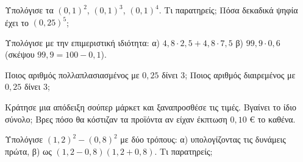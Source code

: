 \ex Υπολόγισε τα $(0{,}1)^2$, $(0{,}1)^3$, $(0{,}1)^4$. Τι παρατηρείς; Πόσα δεκαδικά ψηφία έχει το $(0{,}25)^5$;

\ex Υπολόγισε με την επιμεριστική ιδιότητα: α) $4{,}8\cdot2{,}5+4{,}8\cdot7{,}5$ \quad β) $99{,}9\cdot0{,}6$ (σκέψου $99{,}9=100-0{,}1$).

\ex Ποιος αριθμός πολλαπλασιασμένος με $0{,}25$ δίνει $3$; Ποιος αριθμός διαιρεμένος με $0{,}25$ δίνει $3$;


\ex Κράτησε μια απόδειξη σούπερ μάρκετ και ξαναπροσθέσε τις τιμές. Βγαίνει το ίδιο σύνολο; Βρες πόσο θα κόστιζαν τα προϊόντα αν είχαν έκπτωση $0{,}10$ € το καθένα.

\ex Υπολόγισε $(1{,}2)^2-(0{,}8)^2$ με δύο τρόπους: α) υπολογίζοντας τις δυνάμεις πρώτα, β) ως $(1{,}2-0{,}8)(1{,}2+0{,}8)$. Τι παρατηρείς;
